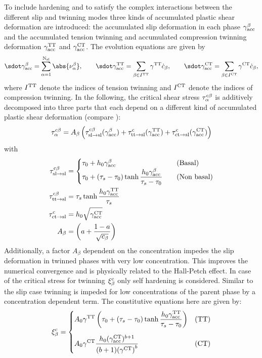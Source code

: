  To include hardening and to satisfy the complex interactions between the different slip and twinning modes three kinds of accumulated plastic shear deformation are introduced: the accumulated slip deformation in each phase $\gamma_{\rm acc}^{\beta}$ and the accumulated tension twinning and accumulated compression twinning deformation $\gamma_{\rm acc}^{\rm TT}$ and $\gamma_{\rm acc}^{\rm CT}$. The evolution equations are given by
  \begin{equation}
    \gammaaccbdot = \sumaNsl \abs{\nuab}, \qquad \gammaaccttdot = \sum_{\beta \in \Itt} \gammatt \cbdot, \qquad \gammaaccctdot = \sum_{\beta \in \Ict} \gammact \cbdot,
  \end{equation}
  where $I^{\rm TT}$ denote the indices of tension twinning and $I^{\rm CT}$ denote the indices of compression twinning. In the following, the critical shear stress $\tau_{\alpha}^{c\beta}$ is additively decomposed into three parts that each depend on a different kind of accumulated plastic shear deformation (compare ):
  \begin{equation}
    \tau_{\alpha}^{c\beta} = A_{\beta} \left( \tau^{\rm c\beta}_{\rm sl\rightarrow sl}(\gamma_{\rm acc}^{\beta}) + \tau^{\rm c}_{\rm tt\rightarrow sl}(\gamma_{\rm acc}^{\rm TT}) + \tau^{\rm c}_{\rm ct\rightarrow sl}(\gamma_{\rm acc}^{\rm CT}) \right)
    \label{eq:tauacb}
  \end{equation}
  with
  \begin{align}
    \tau^{\rm c\beta}_{\rm sl\rightarrow sl} &=
    \begin{cases}
        \tau_0 + {h}_{0} \gamma_{\rm acc}^{\beta} & \text{\quad (Basal)}  \\
        \displaystyle \tau_0 + (\tau_s-\tau_0) \tanh{\frac{{h}_{0}\gamma_{\rm acc}^{\beta}}{\tau_s-\tau_0}} & \text{\quad (Non basal)}
    \end{cases} \\
    \tau^{\rm c \beta}_{\rm tt\rightarrow sl} &= \tau_s \tanh{\frac{{h}_{0}\gamma_{\rm acc}^{\rm TT}}{\tau_s}} \label{eq:tauCttsl}\\
    \tau^{\rm c}_{\rm ct\rightarrow sl} &= {h}_{0} \sqrt{\gamma_{\rm acc}^{\rm CT}} \\
    A_{\beta} & =  \left( a + \frac{1-a}{\sqrt{c_{\beta}}} \right) \label{eq:Ab}
  \end{align}
  Additionally, a factor $A_\beta$ dependent on the concentration impedes the slip deformation in twinned phases with very low concentration. This improves the numerical convergence and is physically related to the Hall-Petch effect. In case of the critical stress for twinning $\xi_{\beta}^{\rm c}$ only self hardening is considered. Similar to the slip case twinning is impeded for low concentrations of the parent phase by a concentration dependent term. The constitutive equations here are given by:
  \begin{equation}
      \xi_{\beta}^{\rm c} = 
      \begin{cases}
          \displaystyle A_0 \gamma^{\rm TT} \left( \tau_0 + (\tau_s - \tau_0) \tanh{\frac{{h}_{0}\gamma_{\rm acc}^{\rm TT}}{\tau_s-\tau_0}} \right)& \text{(TT)}\\[15pt]
          \displaystyle A_0 \gamma^{\rm CT} \frac{{h}_{0} (\gamma_{\rm acc}^{\rm CT})^{b+1}}{(b+1){(\gamma^{\rm CT})}^b}  & \text{(CT)}
      \end{cases}
  \end{equation}

